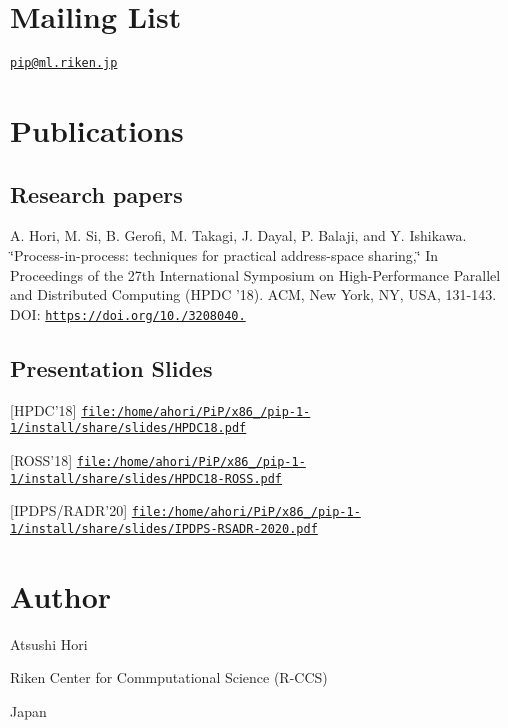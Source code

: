 \section*{Mailing List}

\href{mailto:pip@ml.riken.jp}{\tt pip@ml.\-riken.\-jp}

\section*{Publications}

\subsection*{Research papers}

A. Hori, M. Si, B. Gerofi, M. Takagi, J. Dayal, P. Balaji, and Y. Ishikawa. \char`\"{}\-Process-\/in-\/process\-: techniques for practical address-\/space sharing,\char`\"{} In Proceedings of the 27th International Symposium on High-\/\-Performance Parallel and Distributed Computing (H\-P\-D\-C '18). A\-C\-M, New York, N\-Y, U\-S\-A, 131-\/143. D\-O\-I\-: \href{https://doi.org/10.1145/3208040.3208045}{\tt https\-://doi.\-org/10./3208040.}

\subsection*{Presentation Slides}


\begin{DoxyItemize}
\item \mbox{[}H\-P\-D\-C'18\mbox{]} \href{file:/home/ahori/PiP/x86_64/pip-1-1/install/share/slides/HPDC18.pdf}{\tt file\-:/home/ahori/\-Pi\-P/x86\-\_/pip-\/1-\/1/install/share/slides/\-H\-P\-D\-C18.\-pdf}
\item \mbox{[}R\-O\-S\-S'18\mbox{]} \href{file:/home/ahori/PiP/x86_64/pip-1-1/install/share/slides/HPDC18-ROSS.pdf}{\tt file\-:/home/ahori/\-Pi\-P/x86\-\_/pip-\/1-\/1/install/share/slides/\-H\-P\-D\-C18-\/\-R\-O\-S\-S.\-pdf}
\item \mbox{[}I\-P\-D\-P\-S/\-R\-A\-D\-R'20\mbox{]} \href{file:/home/ahori/PiP/x86_64/pip-1-1/install/share/slides/IPDPS-RSADR-2020.pdf}{\tt file\-:/home/ahori/\-Pi\-P/x86\-\_/pip-\/1-\/1/install/share/slides/\-I\-P\-D\-P\-S-\/\-R\-S\-A\-D\-R-\/2020.\-pdf} \section*{Author}
\end{DoxyItemize}

Atsushi Hori \par
Riken Center for Commputational Science (R-\/\-C\-C\-S) \par
Japan \par
